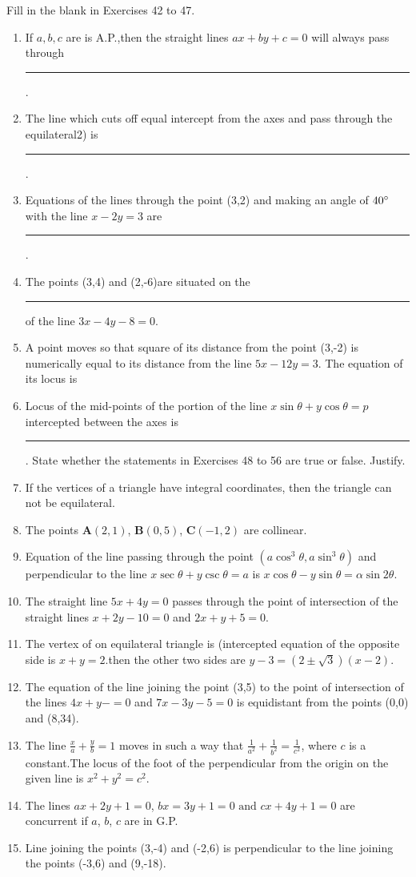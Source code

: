 \documentclass[12pt]{article}
\let\vec\mathbf
\begin{document}
Fill in the blank in Exercises 42 to 47.
\begin{enumerate}[resume]
\item If $a,b,c$ are is A.P.,then the straight lines $ax+by+c=0$ will always pass through \rule{1cm}{0.15mm}.
\item The line which cuts off equal intercept from the axes and pass through the equilateral2) is \rule{1cm}{0.15mm}.
\item Equations of the lines through the point (3,2) and making an angle of $40\degree$ with the line $x-2y=3$ are \rule{1cm}{0.15mm}.   
\item The points (3,4) and (2,-6)are situated on the \rule{1cm}{0.15mm} of the line $3x-4y-8=0$.
\item A point moves so that square of its distance from the point (3,-2) is numerically equal to its distance from the line $5x-12y=3$. The equation of its locus is %
\item Locus of the mid-points of the portion of the line $x\sin\theta+y\cos\theta=p$ intercepted between the axes is \rule{1cm}{0.15mm}.
State whether the statements in Exercises 48 to 56 are true or false. Justify.
\item If the vertices of a triangle have integral coordinates, then the triangle can not be equilateral.
\item The points $\vec{A}(2,1)$, $\vec{B}(0,5)$, $\vec{C}(-1,2)$ are collinear.
\item Equation of the line passing through the point $(a\cos^3\theta, a\sin^3\theta)$ and perpendicular to the line $x\sec\theta+y\csc\theta=a$ is $x\cos\theta-y\sin\theta=\alpha\sin2\theta$.
\item The straight line $5x+4y=0$ passes through the point of intersection of the straight lines $x+2y-10=0$ and $2x+y+5=0$.
\item The vertex of on equilateral triangle is (intercepted equation of the opposite side is $x+y=2$.then the other two sides are $y-3=(2\pm\sqrt{3})(x-2)$.
\item The equation of the line joining the point (3,5) to the point of intersection of the lines $4x+y-=0$ and $7x-3y-5=0$ is equidistant from the points (0,0) and (8,34).
\item The line $\frac{x}{a}+\frac{y}{b}=1$ moves in such a way that $\frac{1}{a^2}+\frac{1}{b^2}=\frac{1}{c^2}$, where $c$ is a constant.The locus of the foot of the perpendicular from the origin on the given line is $x^2+y^2=c^2$.
\item The lines $ax+2y+1=0$, $bx=3y+1=0\text{ and }cx+4y+1=0$ are concurrent if $a$, $b$, $c$ are in G.P.
\item Line joining the points (3,-4) and (-2,6) is perpendicular to the line joining the points (-3,6) and (9,-18).
\end{enumerate}
\end{document}
